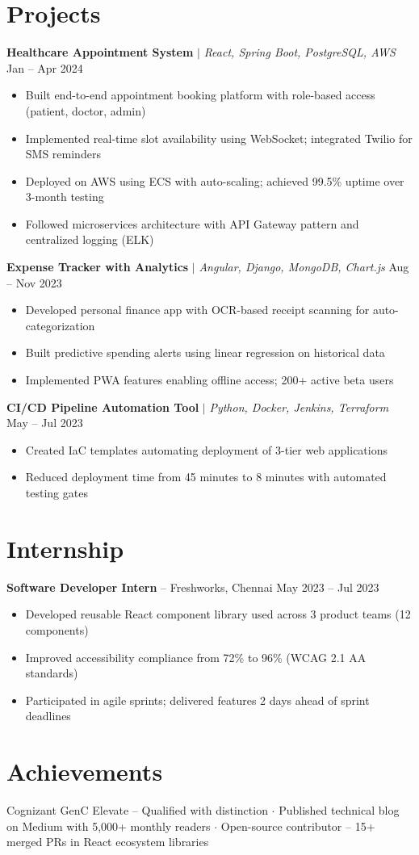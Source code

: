 \documentclass[10pt,a4paper]{article}
\begin{document}
\section{Projects}

\textbf{Healthcare Appointment System} $\mid$ {\small\itshape React, Spring Boot, PostgreSQL, AWS} \hfill {\color{accent}\small Jan -- Apr 2024}
\begin{itemize}
    \item Built end-to-end appointment booking platform with role-based access (patient, doctor, admin)
    \item Implemented real-time slot availability using WebSocket; integrated Twilio for SMS reminders
    \item Deployed on AWS using ECS with auto-scaling; achieved 99.5\% uptime over 3-month testing
    \item Followed microservices architecture with API Gateway pattern and centralized logging (ELK)
\end{itemize}

\textbf{Expense Tracker with Analytics} $\mid$ {\small\itshape Angular, Django, MongoDB, Chart.js} \hfill {\color{accent}\small Aug -- Nov 2023}
\begin{itemize}
    \item Developed personal finance app with OCR-based receipt scanning for auto-categorization
    \item Built predictive spending alerts using linear regression on historical data
    \item Implemented PWA features enabling offline access; 200+ active beta users
\end{itemize}

\textbf{CI/CD Pipeline Automation Tool} $\mid$ {\small\itshape Python, Docker, Jenkins, Terraform} \hfill {\color{accent}\small May -- Jul 2023}
\begin{itemize}
    \item Created IaC templates automating deployment of 3-tier web applications
    \item Reduced deployment time from 45 minutes to 8 minutes with automated testing gates
\end{itemize}

\section{Internship}

\textbf{Software Developer Intern} -- Freshworks, Chennai \hfill {\color{accent}\small May 2023 -- Jul 2023}
\begin{itemize}
    \item Developed reusable React component library used across 3 product teams (12 components)
    \item Improved accessibility compliance from 72\% to 96\% (WCAG 2.1 AA standards)
    \item Participated in agile sprints; delivered features 2 days ahead of sprint deadlines
\end{itemize}

\section{Achievements}

{\small
Cognizant GenC Elevate -- Qualified with distinction $\cdot$ Published technical blog on Medium with 5,000+ monthly readers $\cdot$ Open-source contributor -- 15+ merged PRs in React ecosystem libraries
}
\end{document}
